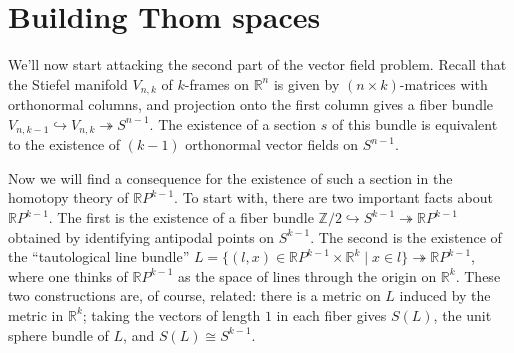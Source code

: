 \documentclass{article}
\providecommand{\OutputBuildingThomSpaces}{3}
\newcommand{\Z}{\mathbb{Z}}
\newcommand{\R}{\mathbb{R}}
\newcommand{\RP}{\R P}
\newcommand{\into}{\hookrightarrow}
\newcommand{\onto}{\twoheadrightarrow}
\begin{document}
\section{Building Thom spaces} %
\ifx\OutputBuildingThomSpaces\undefined\else
We'll now start attacking the second part of the vector field problem.  Recall that the Stiefel manifold $V_{n, k}$ of $k$-frames on $\R^n$ is given by $(n \times k)$-matrices with orthonormal columns, and projection onto the first column gives a fiber bundle $V_{n, k-1} \into V_{n, k} \onto S^{n-1}$.  The existence of a section $s$ of this bundle is equivalent to the existence of $(k-1)$ orthonormal vector fields on $S^{n-1}$.

Now we will find a consequence for the existence of such a section in the homotopy theory of $\RP^{k-1}$.  To start with, there are two important facts about $\RP^{k-1}$.  The first is the existence of a fiber bundle $\Z/2 \into S^{k-1} \onto \RP^{k-1}$ obtained by identifying antipodal points on $S^{k-1}$.  The second is the existence of the ``tautological line bundle'' $L = \{(l, x) \in \RP^{k-1} \times \R^k \mid x \in l\} \onto \RP^{k-1}$, where one thinks of $\RP^{k-1}$ as the space of lines through the origin on $\R^k$.  These two constructions are, of course, related: there is a metric on $L$ induced by the metric in $\R^k$; taking the vectors of length $1$ in each fiber gives $S(L)$, the unit sphere bundle of $L$, and $S(L) \cong S^{k-1}$.
\end{document}
